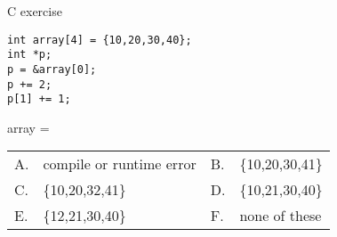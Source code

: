 \begin{frame}[fragile]{C exercise}
\lstset{language=C,style=small}
\begin{lstlisting}
int array[4] = {10,20,30,40};
int *p;
p = &array[0];
p += 2;
p[1] += 1;
\end{lstlisting}
array = \\
\begin{tabular}{llll}
    A. & compile or runtime error   & B. & \{10,20,30,41\} \\
C. & \{10,20,32,41\} & D. & \{10,21,30,40\} \\
E. & \{12,21,30,40\} & F. & none of these \\
\end{tabular}
\end{frame}
